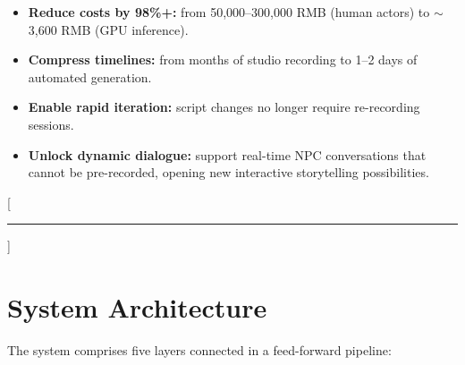 \documentclass[11pt,a4paper]{article}
\begin{document}
\begin{itemize}
    \item \textbf{Reduce costs by 98\%+:} from 50,000--300,000 RMB (human actors) to $\sim$3,600 RMB (GPU inference).
    \item \textbf{Compress timelines:} from months of studio recording to 1--2 days of automated generation.
    \item \textbf{Enable rapid iteration:} script changes no longer require re-recording sessions.
    \item \textbf{Unlock dynamic dialogue:} support real-time NPC conversations that cannot be pre-recorded, opening new interactive storytelling possibilities.
\end{itemize}

\newpage

\appendix
\setcounter{secnumdepth}{2}
[\vspace{-0.5em}\textcolor{accent}{\rule{\textwidth}{0.4pt}}]

\section{System Architecture}

The system comprises five layers connected in a feed-forward pipeline:
\end{document}
